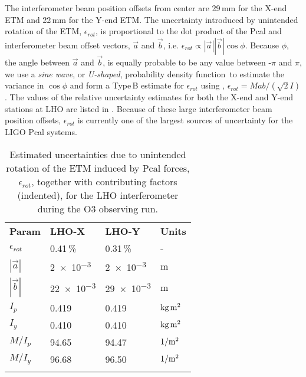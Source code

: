 \documentclass[12pt,a4paper,final]{iopart}
\begin{document}
The interferometer beam position offsets from center are 29\,mm for the X-end ETM and 22\,mm for the Y-end ETM.  The uncertainty introduced by unintended rotation of the ETM, $\epsilon_{rot}$, is proportional to the dot product of the Pcal and interferometer  beam offset vectors, $\vec{a}$ and $\vec{b}$, i.e. $\epsilon_{rot} \propto |\vec{a}| |\vec{b}| \cos\phi$.     Because $\phi$, the angle between $\vec{a}$ and $\vec{b}$, is equally probable to be any value between -$\pi$ and $\pi$, we use a {\em sine wave}, or {\em U-shaped}, probability density function\,\cite{bendat} to estimate the variance in $ \cos\phi$ and form a Type\,B estimate for $\epsilon_{rot}$ using ,  $\epsilon_{rot} = Mab/(\sqrt{2}I)$.   The values of the relative uncertainty estimates for both the X-end and Y-end stations at LHO are listed in . Because of these large interferometer beam position offsets,   $\epsilon_{rot}$ is currently one of the largest sources of uncertainty for the LIGO Pcal systems.
%
\begin{table}[t]
\caption{Estimated uncertainties due to unintended rotation of the ETM induced by Pcal forces, $\epsilon_{rot}$, together with contributing factors (indented),  for the LHO interferometer during the O3 observing run.}
\vspace{0.1in}
\begin{indented}
    \item[]\begin{tabular}{L{1.5cm} C{2.5cm} C{2.5cm} C{1.5cm}}
        \Xhline{4\arrayrulewidth}
         \bf Param & {\bf LHO-X} & {\bf LHO-Y} & {\bf Units}  \\
        \Xhline{2\arrayrulewidth}
        $\epsilon_{rot}$ & 0.41\,\% & 0.31\,\% & -  \\
        
         \hspace{5 mm}$|\vec{a}|$  & \num{2e-3} & \num{2e-3}  & m \\
        
        \hspace{5 mm}$|\vec{b}|$  & \num{22e-3} & \num{29e-3} & m \\
        
        \hspace{5 mm}$I_p$  & 0.419 & 0.419 & $\rm kg\,m^2$ \\
        
        \hspace{5 mm}$I_y$  & 0.410 & 0.410 & $\rm kg\,m^2$\\
        
        \hspace{5 mm}$M/I_p $   & 94.65 & 94.47  & $\rm 1/m^{2}$\\
        
        \hspace{5 mm}$M/I_y$   & 96.68 &96.50  & $\rm 1/m^{2}$ \\
        \Xhline{4\arrayrulewidth}
        \end{tabular}
\label{tab:rot_values}
\end{indented}
\end{table}
%
\end{document}
